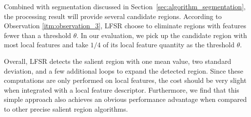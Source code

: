 Combined with segmentation discussed in Section~\ref{sec:algorithm_segmentation}, the processing result will provide several candidate regions. According to Observation \ref{itm:observation_3}, LFSR choose to eliminate regions with features fewer than a threshold $\theta$. In our evaluation, we pick up the candidate region with most local features and take $1/4$ of its local feature quantity as the threshold $\theta$.

Overall, LFSR detects the salient region with one mean value, two standard deviation, and a few additional loops to expand the detected region. Since these computations are only performed on local features, the cost should be very slight when integrated with a local feature descriptor. Furthermore, we find that this simple approach also achieves an obvious performance advantage when compared to other precise salient region algorithms.